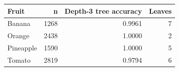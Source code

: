 \begin{tabular}{lrrr}
\toprule
Fruit & n & Depth-3 tree accuracy & Leaves \\
\midrule
Banana & 1268 & 0.9961 & 7 \\
Orange & 2438 & 1.0000 & 2 \\
Pineapple & 1590 & 1.0000 & 5 \\
Tomato & 2819 & 0.9794 & 6 \\
\bottomrule
\end{tabular}
